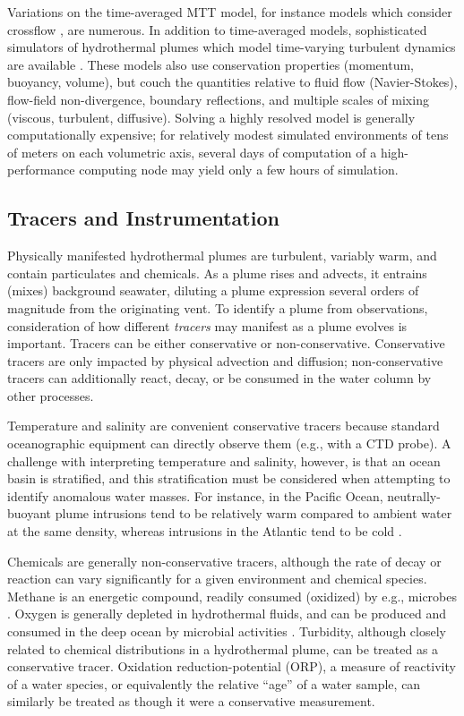 Variations on the time-averaged MTT model, for instance models which consider crossflow \autocite{tohidi2016highly}, are numerous. In addition to time-averaged models, sophisticated simulators of hydrothermal plumes which model time-varying turbulent dynamics are available \autocite{lavelle2013turbulent}. These models also use conservation properties (momentum, buoyancy, volume), but couch the quantities relative to fluid flow (Navier-Stokes), flow-field non-divergence, boundary reflections, and multiple scales of mixing (viscous, turbulent, diffusive). Solving a highly resolved model is generally computationally expensive; for relatively modest simulated environments of tens of meters on each volumetric axis, several days of computation of a high-performance computing node may yield only a few hours of simulation.

\subsection{Tracers and Instrumentation}
Physically manifested hydrothermal plumes are turbulent, variably warm, and contain particulates and chemicals.
As a plume rises and advects, it entrains (mixes) background seawater, diluting a plume expression several orders of magnitude from the originating vent.
To identify a plume from observations, consideration of how different \emph{tracers} may manifest as a plume evolves is important.
Tracers can be either conservative or non-conservative. 
Conservative tracers are only impacted by physical advection and diffusion; non-conservative tracers can additionally react, decay, or be consumed in the water column by other processes.

Temperature and salinity are convenient conservative tracers because standard oceanographic equipment can directly observe them (e.g., with a CTD probe).
A challenge with interpreting temperature and salinity, however, is that an ocean basin is stratified, and this stratification must be considered when attempting to identify anomalous water masses. For instance, in the Pacific Ocean, neutrally-buoyant plume intrusions tend to be relatively warm compared to ambient water at the same density, whereas intrusions in the Atlantic tend to be cold \autocite{speer1989model}.

Chemicals are generally non-conservative tracers, although the rate of decay or reaction can vary significantly for a given environment and chemical species. Methane is an energetic compound, readily consumed (oxidized) by e.g., microbes \autocite{petersen2009methanotrophic}. Oxygen is generally depleted in hydrothermal fluids, and can be produced and consumed in the deep ocean by microbial activities \autocite{johnson1986situ,smith1985maerozooplankton}. Turbidity, although closely related to chemical distributions in a hydrothermal plume, can be treated as a conservative tracer. Oxidation reduction-potential (ORP), a measure of reactivity of a water species, or equivalently the relative ``age'' of a water sample, can similarly be treated as though it were a conservative measurement.

